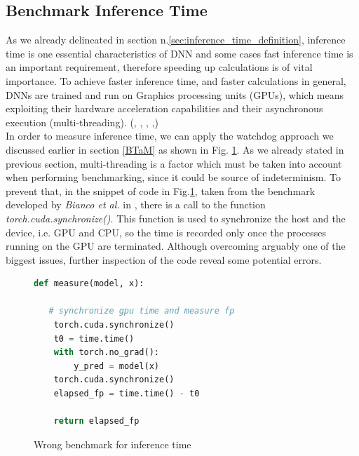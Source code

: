 \subsection{Benchmark Inference Time}\label{sec:ben_inf}
As we already delineated in section n.\ref{sec:inference_time_definition}, inference time is one essential characteristics of DNN and some cases fast inference time is an important requirement, therefore speeding up calculations is of vital importance. To achieve faster inference time, and faster calculations in general, DNNs are trained and run on Graphics processing units (GPUs), which means exploiting their hardware acceleration capabilities and their asynchronous execution (multi-threading).  (\cite{8090194}, \cite{10.1007/978-3-642-04274-4_39}, \cite{10.1145/3089801.3089804}, \cite{paine2013gpu},\cite{OH20041311})\\
In order to measure inference time, we can apply the watchdog approach we discussed earlier in section \ref{BTaM} as shown in Fig. \ref{fig:wrong_inf}. As we already stated in previous section, multi-threading is a factor which must be taken into account when performing benchmarking, since it could be source of indeterminism. To prevent that, in the snippet of code in Fig.\ref{fig:wrong_inf}, taken from the benchmark developed by \textit{Bianco et al.} in \cite{bianco2018dnnsbench}, there is a call to the function \textit{torch.cuda.synchronize()}. This function is used to synchronize the host and the device, i.e. GPU and CPU, so the time is recorded only once the processes running on the GPU are terminated. Although overcoming arguably one of the biggest issues, further inspection of the code reveal some potential errors.\\
\begin{figure}[h]
\begin{lstlisting}[language=python]
def measure(model, x):

   # synchronize gpu time and measure fp
	torch.cuda.synchronize()
	t0 = time.time()
	with torch.no_grad():
		y_pred = model(x)
	torch.cuda.synchronize()
	elapsed_fp = time.time() - t0
	
	return elapsed_fp

\end{lstlisting}
\caption[Wrong benchmark for inference time]{Wrong benchmark for inference time \cite{bianco2018dnnsbench}}
\label{fig:wrong_inf}
\end{figure}




